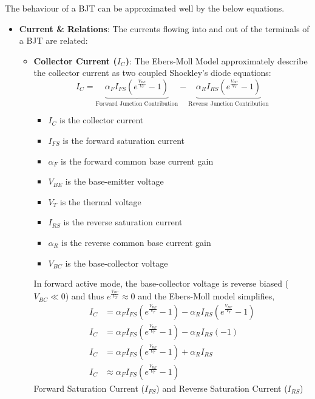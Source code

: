 The behaviour of a BJT can be approximated well by the below equations.
\begin{itemize}
  \item \textbf{Current \& Relations}:
    The currents flowing into and out of the terminals of a BJT are
    related:
    \begin{itemize}
      \item \textbf{Collector Current (\(I_C\))}:
        The Ebers-Moll Model approximately describe the collector current as
        two coupled Shockley's diode equations:
        \[
          I_C = \underbrace{\alpha_F I_{FS} \left( e^{\frac{V_{BE}}{V_T}} - 1 \right)}_{\text{Forward Junction Contribution}} - \underbrace{\alpha_R I_{RS} \left( e^{\frac{V_{BC}}{V_T}} - 1 \right)}_{\text{Reverse Junction Contribution}}
        \]
        \begin{itemize}
          \item \(I_C\) is the collector current
          \item \(I_{FS}\) is the forward saturation current
          \item \(\alpha_F\) is the forward common base current gain
          \item \(V_{BE}\) is the base-emitter voltage
          \item \(V_T\) is the thermal voltage
          \item \(I_{RS}\) is the reverse saturation current
          \item \(\alpha_R\) is the reverse common base current gain
          \item \(V_{BC}\) is the base-collector voltage
        \end{itemize}
        In forward active mode, the base-collector voltage is reverse biased
        (\(V_{BC} \ll 0\)) and thus \( e^{\frac{V_{BC}}{V_T}} \approx 0 \) and the
        Ebers-Moll model simplifies,
        \begin{align*}
          I_C &= \alpha_F I_{FS} \left( e^{\frac{V_{BE}}{V_T}} - 1 \right) - \alpha_R I_{RS} \left( e^{\frac{V_{BC}}{V_T}} - 1 \right) \\
          I_C &= \alpha_F I_{FS} \left( e^{\frac{V_{BE}}{V_T}} - 1 \right) - \alpha_R I_{RS}(-1) \\
          I_C &= \alpha_F I_{FS} \left( e^{\frac{V_{BE}}{V_T}} - 1 \right) + \alpha_R I_{RS} \\
          I_C &\approx \alpha_F I_{FS} \left( e^{\frac{V_{BE}}{V_T}} - 1 \right)
        \end{align*}
        Forward Saturation Current (\(I_{FS}\)) and Reverse Saturation Current (\(I_{RS}\))

\end{itemize}
\end{itemize}

